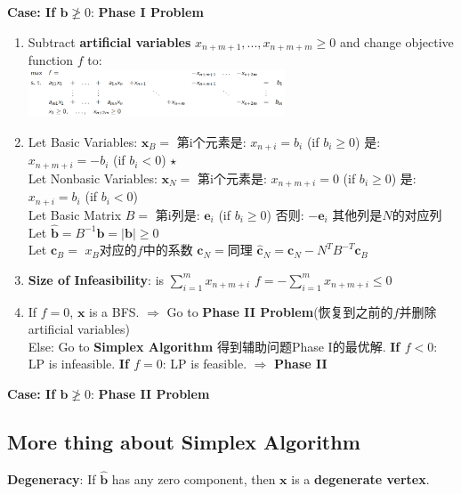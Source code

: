 \documentclass[9pt]{article}
\begin{document}
\textbf{Case: If $\mathbf{b}\ngeq0$}: \textbf{Phase I Problem}
\begin{enumerate}[itemsep=-2pt, topsep=-2pt]
    \item Subtract \textbf{artificial variables} $x_{n+m+1},...,x_{n+m+m}\geq0$ and change objective function $f$ to: \\    
    {\centering \includegraphics[width=0.6\textwidth]{formula.png}}
    \item Let {\small Basic Variables: $\mathbf{x}_{B}=$ 第i个元素是: $x_{n+i}=b_i$ (if $b_i\geq0$) \quad 是:$x_{n+m+i}=-b_i$ (if $b_i<0$) $\star$} \\
    {\small Let Nonbasic Variables: $\mathbf{x}_{N}=$ 第i个元素是: $x_{n+m+i}=0$ (if $b_i\geq0$)} \quad  是:$x_{n+i}=b_i$ (if $b_i<0$)\\
    {\small Let Basic Matrix $B=$ 第i列是: $\mathbf{e}_i$ (if $b_i\geq0$) 否则: $-\mathbf{e}_i$ 其他列是$N$的对应列 \qquad \quad Let $\widehat{\mathbf{b}}=B^{-1}\mathbf{b}=|\mathbf{b}|\geq0$} \\
    {\small Let $\mathbf{c}_B=$ $x_B$对应的$f$中的系数  \qquad $\mathbf{c}_N=$同理 \qquad $\widehat{\mathbf{c}}_N=\mathbf{c}_N-N^TB^{-T}\mathbf{c}_B$}
    \item \textbf{Size of Infeasibility}: is $\sum^m_{i=1}x_{n+m+i}$ \qquad $f=-\sum^m_{i=1}x_{n+m+i}\leq0$
    \item If $f=0$, $\mathbf{x}$ is a BFS. $\Rightarrow$ Go to \textbf{Phase II Problem}{\small (恢复到之前的$f$并删除artificial variables)} \\
    Else: Go to \textbf{Simplex Algorithm} {\small 得到辅助问题Phase I的最优解.} \quad \textbf{If $f<0$}: LP is infeasible. \quad \textbf{If $f=0$}: LP is feasible. $\Rightarrow$ \textbf{Phase II}
\end{enumerate}

\textbf{Case: If $\mathbf{b}\ngeq0$}: \textbf{Phase II Problem}


\subsection{More thing about Simplex Algorithm}

\textbf{Degeneracy}: If $\widehat{\mathbf{b}}$ has any zero component, then $\mathbf{x}$ is a \textbf{degenerate vertex}. 
\end{document}
